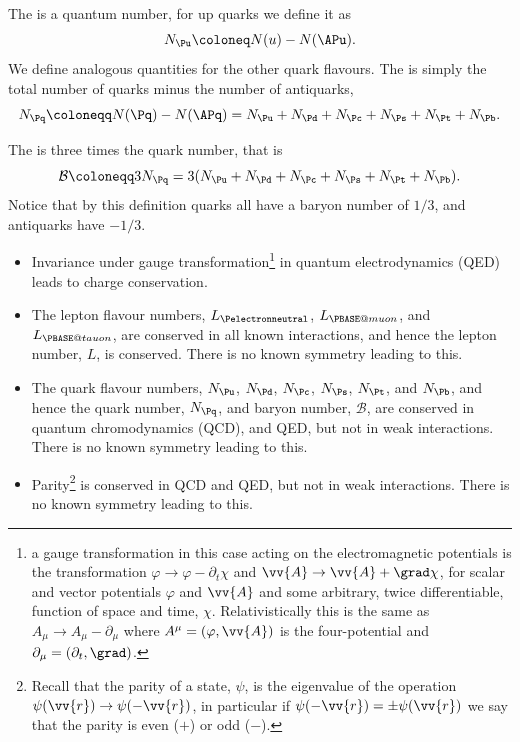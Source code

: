 \documentclass[fleqn]{NotesClass}
\makeatletter
\newcommand{\Pmuonneutral}{\ensuremath{\PBASE@muon}}
\newcommand{\Ptauneutral}{\ensuremath{\PBASE@tauon}}
\newcommand*{\baryonnumber}{\mathcal{B}}
\makeatother
\begin{document}
    The  is a quantum number, for up quarks we define it as
    \begin{equation}
        N_{\Pu} \coloneq N(u) - N(\APu).
    \end{equation}
    We define analogous quantities for the other quark flavours.
    The  is simply the total number of quarks minus the number of antiquarks,
    \begin{equation}
        N_{\Pq} \coloneqq N(\Pq) - N(\APq) = N_{\Pu} + N_{\Pd} + N_{\Pc} + N_{\Ps}+ N_{\Pt} + N_{\Pb}.
    \end{equation}
    
    The  is three times the quark number, that is
    \begin{equation}
        \baryonnumber \coloneqq 3N_{\Pq} = 3(N_{\Pu} + N_{\Pd} + N_{\Pc} + N_{\Ps}+ N_{\Pt} + N_{\Pb}).
    \end{equation}
    Notice that by this definition quarks all have a baryon number of \(1/3\), and antiquarks have \(-1/3\).
    
    \begin{itemize}
        \item Invariance under gauge transformation\footnote{a gauge transformation in this case acting on the electromagnetic potentials is the transformation \(\varphi \to \varphi - \partial_t\chi\) and \(\vv{A} \to \vv{A} + \grad\chi\), for scalar and vector potentials \(\varphi\) and \(\vv{A}\) and some arbitrary, twice differentiable, function of space and time, \(\chi\). Relativistically this is the same as \(A_\mu \to A_\mu - \partial_\mu\) where \(A^\mu = (\varphi, \vv{A})\) is the four-potential and \(\partial_\mu = (\partial_t, \grad)\).} in quantum electrodynamics (QED) leads to charge conservation.
        \item The lepton flavour numbers, \(L_{\Pelectronneutral}\), \(L_{\Pmuonneutral}\), and \(L_{\Ptauneutral}\), are conserved in all known interactions, and hence the lepton number, \(L\), is conserved.
        There is no known symmetry leading to this.
        \item The quark flavour numbers, \(N_{\Pu}\), \(N_{\Pd}\), \(N_{\Pc}\), \(N_{\Ps}\), \(N_{\Pt}\), and \(N_{\Pb}\), and hence the quark number, \(N_{\Pq}\), and baryon number, \(\baryonnumber\), are conserved in quantum chromodynamics (QCD), and QED, but not in weak interactions.
        There is no known symmetry leading to this.
        \item Parity\footnote{Recall that the parity of a state, \(\psi\), is the eigenvalue of the operation \(\psi(\vv{r}) \to \psi(-\vv{r})\), in particular if \(\psi(-\vv{r}) = \pm \psi(\vv{r})\) we say that the parity is even (\(+\)) or odd (\(-\)).} is conserved in QCD and QED, but not in weak interactions.
        There is no known symmetry leading to this.
    \end{itemize}
    
\end{document}
